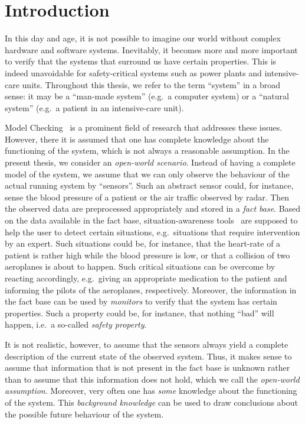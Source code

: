 \chapter{Introduction}\label{ch:introduction}

In this day and age, it is not possible to imagine our world without complex
hardware and software systems.  Inevitably, it becomes more and more important
to verify that the systems that surround us have certain properties.  This is
indeed unavoidable for safety-critical systems such as power plants and
intensive-care units.
%
Throughout this thesis, we refer to the term \enquote{system} in a broad sense:
it may be a \enquote{man-made system} (e.g.\ a computer system) or a
\enquote{natural system} (e.g.\ a patient in an intensive-care unit).

Model Checking~\cite{ClGP-99,BaKa-08} is a prominent field of research that
addresses these issues.  However, there it is assumed that one has complete
knowledge about the functioning of the system, which is not always a reasonable
assumption.
%
In the present thesis, we consider an \emph{open-world scenario}.  Instead of
having a complete model of the system, we assume that we can only observe the
behaviour of the actual running system by \enquote{sensors}.  Such an abstract
sensor could, for instance, sense the blood pressure of a patient or the air
traffic observed by radar.  Then the observed data are preprocessed
appropriately and stored in a \emph{fact base}.  Based on the data available in
the fact base, situation-awareness tools~\cite{BBB+-TABLEAUX09,End-HF95} are
supposed to help the user to detect certain situations, e.g.\ situations that
require intervention by an expert.  Such situations could be, for instance, that
the heart-rate of a patient is rather high while the blood pressure is low, or
that a collision of two aeroplanes is about to happen.  Such critical situations
can be overcome by reacting accordingly, e.g.\ giving an appropriate medication
to the patient and informing the pilots of the aeroplanes, respectively.
%
Moreover, the information in the fact base can be used by \emph{monitors} to
verify that the system has certain properties.  Such a property could be, for
instance, that nothing \enquote{bad} will happen, i.e.~a so-called \emph{safety
property}.

It is not realistic, however, to assume that the sensors always yield a complete
description of the current state of the observed system.  Thus, it makes sense
to assume that information that is not present in the fact base is unknown
rather than to assume that this information does not hold, which we call the
\emph{open-world assumption}.
%
Moreover, very often one has \emph{some} knowledge about the functioning of the
system.  This \emph{background knowledge} can be used to draw conclusions about
the possible future behaviour of the system.

